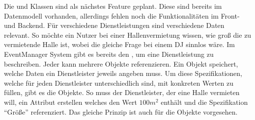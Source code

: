 Die  und  Klassen sind als nächstes Feature geplant. Diese sind bereits im Datenmodell vorhanden, allerdings fehlen noch die Funktionalitäten im Front- und Backend. Für verschiedene Dienstleistungen sind verschiedene Daten relevant. So möchte ein Nutzer \zB bei einer Hallenvermietung wissen, wie groß die zu vermietende Halle ist, wobei die gleiche Frage bei einem DJ sinnlos wäre. Im EventManager System gibt es bereits den , um eine Dienstleistung zu beschreiben. Jeder  kann mehrere  Objekte referenzieren. Ein  Objekt speichert, welche Daten ein Dienstleister jeweils angeben muss. Um diese Spezifikationen, welche für jeden Dienstleister unterschiedlich sind, mit konkreten Werten zu füllen, gibt es die  Objekte. So muss der Dienstleister, der eine Halle vermieten will, ein Attribut erstellen welches \zB den Wert $100 m^2$ enthält und die Spezifikation \enquote{Größe} referenziert. Das gleiche Prinzip ist auch für die  Objekte vorgesehen.
